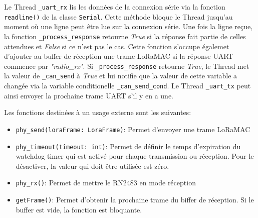     Le Thread \texttt{\_uart\_rx} lis les données de la connexion série via la fonction
    \texttt{readline()} de la classe \texttt{Serial}. Cette méthode bloque le Thread jusqu'au 
    moment où une ligne peut être lue sur la connexion série. Une fois la ligne reçue, la fonction 
    \texttt{\_process\_response} retourne \textit{True} si la réponse fait partie de celles 
    attendues et \textit{False} si ce n'est pas le cas. Cette fonction s'occupe égalemet d'ajouter 
    au buffer de réception une trame LoRaMAC si la réponse UART commence par \textit{"radio\_rx"}. 
    Si \texttt{\_process\_response} retourne 
    \textit{True}, le Thread met la valeur de \texttt{\_can\_send} à \textit{True} et lui notifie que la valeur de cette variable a changée via la variable conditionelle \texttt{\_can\_send\_cond}. Le Thread \texttt{\_uart\_tx} peut ainsi envoyer la prochaine trame UART s'il y en a une.

    Les fonctions destinées à un usage externe sont les suivantes:
    \begin{itemize}
        \item \texttt{phy\_send(loraFrame: LoraFrame)}: Permet d'envoyer une trame LoRaMAC
        \item \texttt{phy\_timeout(timeout: int)}: Permet de définir le temps d'expiration du watchdog timer qui est activé pour chaque transmission ou réception. Pour le désactiver, la valeur qui doit être utilisée est zéro.
        \item \texttt{phy\_rx()}: Permet de mettre le RN2483 en mode réception
        \item \texttt{getFrame()}: Permet d'obtenir la prochaine trame du biffer de réception. Si le buffer est vide, la fonction est bloquante.
    \end{itemize}